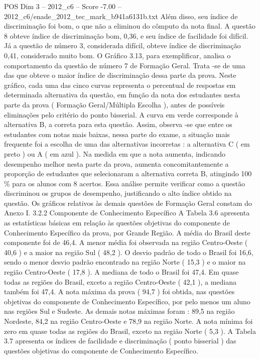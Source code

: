 \begin{textsample}{POS Dim 3 – 2012\_c6 – Score -7.00 – 2012\_c6/enade\_2012\_tec\_mark\_b941a6131b.txt}
Além disso, seu índice de discriminação foi bom, o que não a eliminou do cômputo da nota final.
A questão 8 obteve índice de discriminação bom, 0,36, e seu índice de facilidade foi difícil.
Já a questão de número 3, considerada difícil, obteve índice de discriminação 0,41, considerado muito bom.
O Gráfico 3.13, para exemplificar, analisa o comportamento da questão de número 7 de Formação Geral.
Trata -se de uma das que obteve o maior índice de discriminação dessa parte da prova.
Neste gráfico, cada uma das cinco curvas representa o percentual de respostas em determinada alternativa da questão, em função da nota dos estudantes nesta parte da prova ( Formação Geral/Múltipla Escolha ), antes de possíveis eliminações pelo critério do ponto bisserial.
A curva em verde corresponde à alternativa B, a correta para esta questão.
Assim, observa -se que entre os estudantes com notas mais baixas, nessa parte do exame, a situação mais frequente foi a escolha de uma das alternativas incorretas : a alternativa C ( em preto ) ou A ( em azul ).
Na medida em que a nota aumenta, indicando desempenho melhor nesta parte da prova, aumenta concomitantemente a proporção de estudantes que selecionaram a alternativa correta B, atingindo 100 \% para os alunos com 8 acertos.
Essa análise permite verificar como a questão discriminou os grupos de desempenho, justificando o alto índice obtido na questão.
Os gráficos relativos às demais questões de Formação Geral constam do Anexo I. 3.2.2 Componente de Conhecimento Específico A Tabela 3.6 apresenta as estatísticas básicas em relação às questões objetivas do componente de Conhecimento Específico da prova, por Grande Região.
A média do Brasil deste componente foi de 46,4.
A menor média foi observada na região Centro-Oeste ( 40,6 ) e a maior na região Sul ( 48,2 ).
O desvio padrão de todo o Brasil foi 16,6, sendo o menor desvio padrão encontrado na região Norte ( 15,3 ) e o maior na região Centro-Oeste ( 17,8 ).
A mediana de todo o Brasil foi 47,4.
Em quase todas as regiões do Brasil, exceto a região Centro-Oeste ( 42,1 ), a mediana também foi 47,4.
A nota máxima da prova ( 94,7 ) foi obtida, nas questões objetivas do componente de Conhecimento Específico, por pelo menos um aluno nas regiões Sul e Sudeste.
As demais notas máximas foram : 89,5 na região Nordeste, 84,2 na região Centro-Oeste e 78,9 na região Norte.
A nota mínima foi zero em quase todas as regiões do Brasil, exceto na região Norte ( 5,3 ).
A Tabela 3.7 apresenta os índices de facilidade e discriminação ( ponto bisserial ) das questões objetivas do componente de Conhecimento Específico.

\end{textsample}
